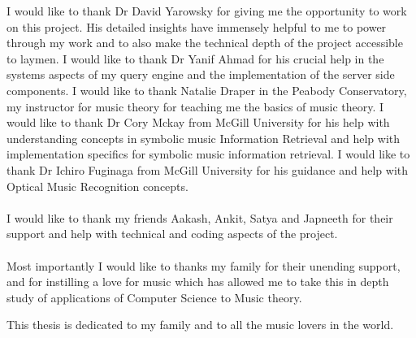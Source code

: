 \begin{frontmatter}
\begin{acknowledgment}
\noindent I would like to thank Dr David Yarowsky for giving me the opportunity to work on this project. His detailed insights have immensely helpful to me to power through my work and to also make the technical depth of the project accessible to laymen. I would like to thank Dr Yanif Ahmad for his crucial help in the systems aspects of my query engine and the implementation of the server side components. I would like to thank Natalie Draper in the Peabody Conservatory, my instructor for music theory for teaching me the basics of music theory. I would like to thank Dr Cory Mckay from McGill University for his help with understanding concepts in symbolic music Information Retrieval and help with implementation specifics for symbolic music information retrieval. I would like to thank Dr Ichiro Fuginaga from McGill University for his guidance and help with Optical Music Recognition concepts. \\\\
I would like to thank my friends Aakash, Ankit, Satya and Japneeth for their support and help with technical and coding aspects of the project. \\\\
Most importantly I would like to thanks my family for their unending support, and for instilling a love for music which has allowed me to take this in depth study of applications of Computer Science to Music theory.

\end{acknowledgment}

\begin{dedication}
 
This thesis is dedicated to my family and to all the music lovers in the world. 

\end{dedication}

\tableofcontents

\listoftables

\listoffigures

\end{frontmatter}
